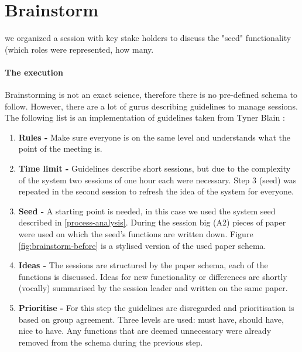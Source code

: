 

\section{Brainstorm}
\label{brainstorm}

we organized a session with key stake holders to discuss the "seed" functionality (which roles were represented, how many.

\paragraph{The execution}
Brainstorming is not an exact science, therefore there is no pre-defined schema to follow.
However, there are a lot of gurus describing guidelines to manage sessions.
The following list is an implementation of guidelines taken from Tyner Blain \cite{brainstormWebsite}:


\begin{enumerate}
	\item \textbf{Rules -} Make sure everyone is on the same level and understands what the point of the meeting is. 
	\item \textbf{Time limit -} Guidelines describe short sessions, but due to the complexity of the system two sessions of one hour each were necessary.
		Step 3 (seed) was repeated in the second session to refresh the idea of the system for everyone.
	\item \textbf{Seed -} A starting point is needed, in this case we used the system seed described in \ref{process-analysis}.
		During the session big (A2) pieces of paper were used on which the seed's functions are written down. Figure \ref{fig:brainstorm-before} is a stylised version of the used paper schema.
	\item \textbf{Ideas -} The sessions are structured by the paper schema, each of the functions is discussed.
		Ideas for new functionality or differences are shortly (vocally) summarised by the session leader  and written on the same paper.
	\item \textbf{Prioritise -} For this step the guidelines are disregarded and prioritisation is based on group agreement.
		Three levels are used: must have, should have, nice to have.
		Any functions that are deemed unnecessary were already removed from the schema during the previous step. 
\end{enumerate}



